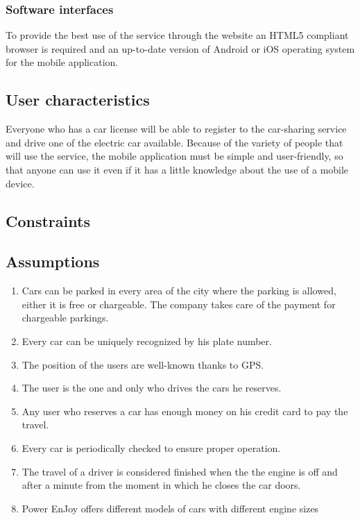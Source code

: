\subsubsection{Software interfaces}
To provide the best use of the service through the website an HTML5 compliant browser is required and an up-to-date version of Android or iOS operating system for the mobile application.





\subsection{User characteristics}
Everyone who has a car license will be able to register to the car-sharing service and drive one of the electric car available.
Because of the variety of people that will use the service, the mobile application must be simple and user-friendly, so that anyone can use it even if it has a little knowledge about the use of a mobile device.

\subsection{Constraints}


\subsection{Assumptions}
\begin{enumerate}
	\item Cars can be parked in every area of the city where the parking is allowed, either it is free or chargeable. The company 		                    takes care of the payment for chargeable parkings. 
	\item Every car can be uniquely recognized by his plate number.
	\item The position of the users are well-known thanks to GPS.
	\item The user is the one and only who drives the cars he reserves.
	\item Any user who reserves a car has enough money on his credit card to pay the travel.
	\item Every car is periodically checked to ensure proper operation.
	\item The travel of a driver is considered finished when the the engine is off and after a minute from the moment in which he closes the car doors.
	\item Power EnJoy offers different models of cars with different engine sizes
\end{enumerate}


